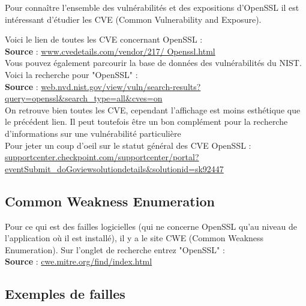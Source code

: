 \documentclass{article}
\begin{document}
	Pour connaître l'ensemble des vulnérabilités et des expositions d'OpenSSL 
	il est intéressant d'étudier les CVE (Common Vulnerability and Exposure).
	
	Voici le lien de toutes les CVE concernant OpenSSL : \\

	\textbf{Source} :
	\href{http://www.cvedetails.com/vendor/217/Openssl.html}
	{www.cvedetails.com/vendor/217/	Openssl.html}\\

	Vous pouvez également parcourir la base de données des vulnérabilités 
	du NIST. Voici la recherche pour "OpenSSL" : \\

	\textbf{Source} :
	\href{http://web.nvd.nist.gov/view/vuln/search-results?query=openssl\&search\_type=all\&cves=on}
	{web.nvd.nist.gov/view/vuln/search-results?query=openssl\&search\_type=all\&cves=on}\\

	On retrouve bien toutes les CVE, cependant l'affichage est moins 	
	esthétique que le précédent lien. Il peut toutefois être un bon complément
	pour la recherche d'informations sur une vulnérabilité particulière\\

	Pour jeter un coup d'oeil sur le statut général des CVE OpenSSL :\\
	\href{https://supportcenter.checkpoint.com/supportcenter/portal?eventSubmit\_doGoviewsolutiondetails\&solutionid=sk92447}
	{supportcenter.checkpoint.com/supportcenter/portal?eventSubmit\_doGoviewsolutiondetails\&solutionid=sk92447}\\

	\subsection{Common Weakness Enumeration}

	Pour ce qui est des failles logicielles (qui ne concerne OpenSSL qu'au 
	niveau de l'application où il est installé), il y a le site CWE (Common 
	Weakness Enumeration). Sur l'onglet de recherche entrez "OpenSSL" :\\

	\textbf{Source} :
	\href{http://cwe.mitre.org/find/index.html}{cwe.mitre.org/find/index.html}\\


	\subsection{Exemples de failles}
	
\end{document}
